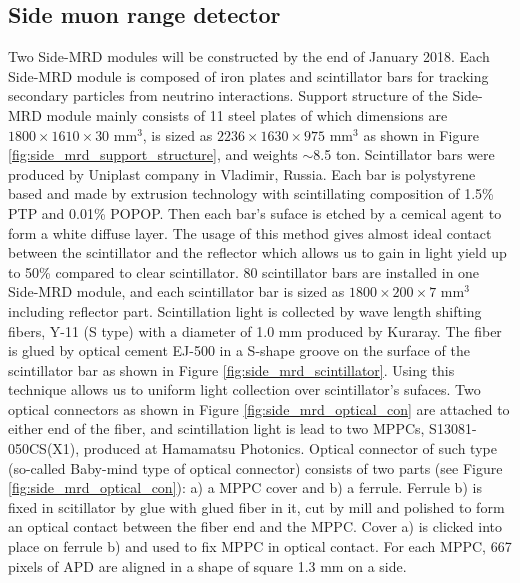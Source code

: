 \subsection{Side muon range detector}
Two Side-MRD modules will be constructed by the end of January 2018. 
Each Side-MRD module is composed of iron plates and scintillator bars for tracking secondary particles from neutrino interactions.
Support structure of the Side-MRD module mainly consists of 11 steel plates of which dimensions are $1800\times1610\times30$ mm$^{3}$, is sized as $2236\times1630\times975$ mm$^{3}$ as shown in Figure \ref{fig:side_mrd_support_structure}, and weights $\sim$8.5 ton. 
Scintillator bars were produced by Uniplast company in Vladimir, Russia. Each bar is polystyrene based and made by extrusion technology with scintillating composition of 1.5\% PTP and 0.01\% POPOP. Then each bar's suface is etched by a cemical agent to form a white diffuse layer. The usage of this method gives almost ideal contact between the scintillator and the reflector which allows us to gain in light yield up to 50\% compared to clear scintillator. 80 scintillator bars are installed in one Side-MRD module, and each scintillator bar is sized as $1800\times200\times7$ mm$^{3}$ including reflector part. 
Scintillation light is collected by wave length shifting fibers, Y-11 (S type) with a diameter of 1.0 mm produced by Kuraray. 
The fiber is glued by optical cement EJ-500 in a S-shape groove on the surface of the scintillator bar as shown in Figure \ref{fig:side_mrd_scintillator}. Using this technique allows us to uniform light collection over scintillator's sufaces.
Two optical connectors as shown in Figure \ref{fig:side_mrd_optical_con} are attached to either end of the fiber, and scintillation light is lead to two MPPCs, S13081-050CS(X1), produced at Hamamatsu Photonics. Optical connector of such type (so-called Baby-mind type of optical connector) consists of two parts (see Figure \ref{fig:side_mrd_optical_con}): a) a MPPC cover and b) a ferrule. Ferrule b) is fixed in scitillator by glue with glued fiber in it, cut by mill and polished to form an optical contact between the fiber end and the MPPC. Cover a) is clicked into place on ferrule b) and used to fix MPPC in optical contact.  
For each MPPC, 667 pixels of APD are aligned in a shape of square 1.3 mm on a side. 

